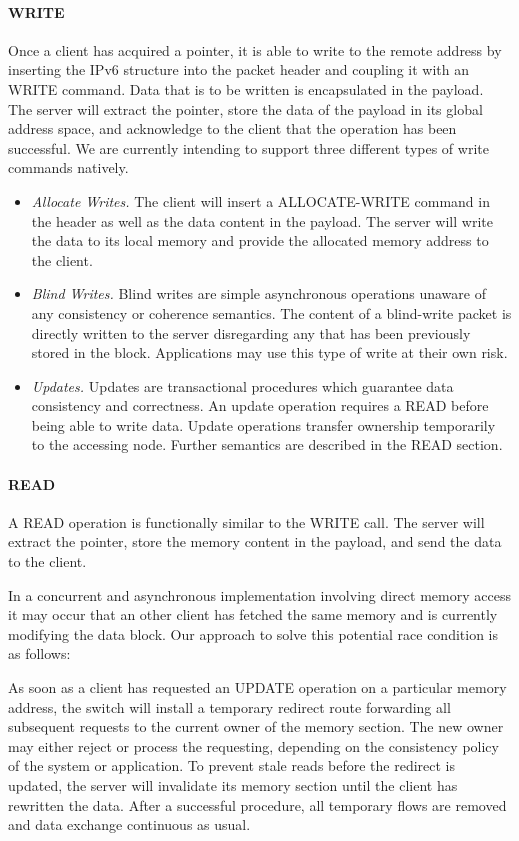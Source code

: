 \paragraph{\textbf{WRITE}}
Once a client has acquired a pointer, it is able to write to the remote address by inserting the IPv6 structure into the packet header and coupling it with an WRITE command. Data that is to be written is encapsulated in the payload. The server will extract the pointer, store the data of the payload in its global address space, and acknowledge to the client that the operation has been successful. We are currently intending to support three different types of write commands natively.
\begin{itemize}
    \item \textit{Allocate Writes.}
    The client will insert a ALLOCATE-WRITE command in the header as well as the data content in the payload. The server will write the data to its local memory and provide the allocated memory address to the client.
    \item \textit{Blind Writes.}
    Blind writes are simple asynchronous operations unaware of any consistency or coherence semantics. The content of a blind-write packet is directly written to the server disregarding any that has been previously stored in the block. Applications may use this type of write at their own risk.
    \item \textit{Updates.}
    Updates are transactional procedures which guarantee data consistency and correctness. An update operation requires a READ before being able to write data. Update operations transfer ownership temporarily to the accessing node. Further semantics are described in the READ section.
\end{itemize}

\paragraph{\textbf{READ}}
A READ operation is functionally similar to the WRITE call. The server will extract the pointer, store the memory content in the payload, and send the data to the client.

In a concurrent and asynchronous implementation involving direct memory access it may occur that an other client has fetched the same memory and is currently modifying the data block. Our approach to solve this potential race condition is as follows:

As soon as a client has requested an UPDATE operation on a particular memory address, the switch will install a temporary redirect route forwarding all subsequent requests to the current owner of the memory section. The new owner may either reject or process the requesting, depending on the consistency policy of the system or application. To prevent stale reads before the redirect is updated, the server will invalidate its memory section until the client has rewritten the data. After a successful procedure, all temporary flows are removed and data exchange continuous as usual.

